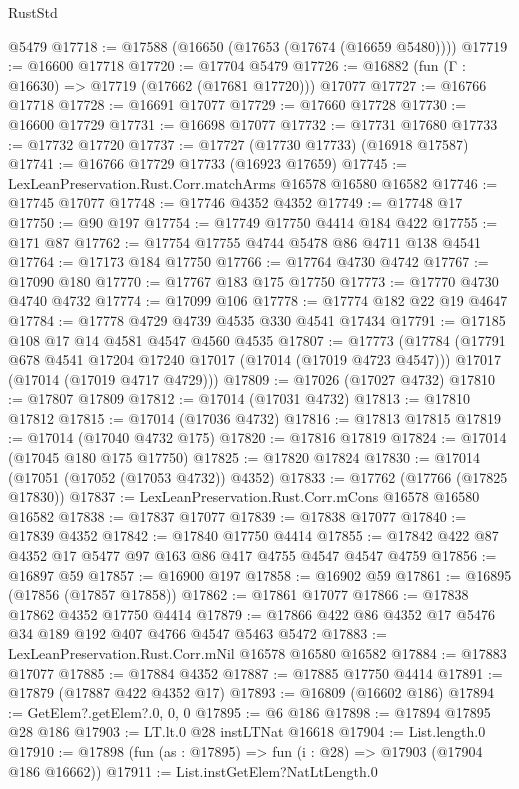 \begin{lexlean}{RustStd}
\begin{coremodule}
{\begin{coremodule}
{{{{{{{{{{{{{{{{{{{{{{{{{{{{{{{{{{{{{{{{{{{{{{{{{{{{{{{    @5479
@17718 := @17588 (@16650 (@17653 (@17674 (@16659 @5480))))
@17719 := @16600 @17718
@17720 := @17704 @5479
@17726 := @16882 (fun (Γ : @16630) => @17719 (@17662 (@17681 @17720))) @17077
@17727 := @16766 @17718
@17728 := @16691 @17077
@17729 := @17660 @17728
@17730 := @16600 @17729
@17731 := @16698 @17077
@17732 := @17731 @17680
@17733 := @17732 @17720
@17737 := @17727 (@17730 @17733) (@16918 @17587)
@17741 := @16766 @17729 @17733 (@16923 @17659)
@17745 := LexLeanPreservation.Rust.Corr.matchArms @16578 @16580 @16582
@17746 := @17745 @17077
@17748 := @17746 @4352 @4352
@17749 := @17748 @17
@17750 := @90 @197
@17754 := @17749 @17750 @4414 @184 @422
@17755 := @171 @87
@17762 := @17754 @17755 @4744 @5478 @86 @4711 @138 @4541
@17764 := @17173 @184 @17750
@17766 := @17764 @4730 @4742
@17767 := @17090 @180
@17770 := @17767 @183 @175 @17750
@17773 := @17770 @4730 @4740 @4732
@17774 := @17099 @106
@17778 := @17774 @182 @22 @19 @4647
@17784 := @17778 @4729 @4739 @4535 @330 @4541 @17434
@17791 := @17185 @108 @17 @14 @4581 @4547 @4560 @4535
@17807 := @17773
    (@17784
      (@17791 @678 @4541 @17204 @17240 @17017 (@17014 (@17019 @4723 @4547)))
      @17017
      (@17014 (@17019 @4717 @4729)))
@17809 := @17026 (@17027 @4732)
@17810 := @17807 @17809
@17812 := @17014 (@17031 @4732)
@17813 := @17810 @17812
@17815 := @17014 (@17036 @4732)
@17816 := @17813 @17815
@17819 := @17014 (@17040 @4732 @175)
@17820 := @17816 @17819
@17824 := @17014 (@17045 @180 @175 @17750)
@17825 := @17820 @17824
@17830 := @17014 (@17051 (@17052 (@17053 @4732)) @4352)
@17833 := @17762 (@17766 (@17825 @17830))
@17837 := LexLeanPreservation.Rust.Corr.mCons @16578 @16580 @16582
@17838 := @17837 @17077
@17839 := @17838 @17077
@17840 := @17839 @4352
@17842 := @17840 @17750 @4414
@17855 := @17842 @422 @87 @4352 @17 @5477 @97 @163 @86 @417 @4755 @4547 @4547 @4759
@17856 := @16897 @59
@17857 := @16900 @197
@17858 := @16902 @59
@17861 := @16895 (@17856 (@17857 @17858))
@17862 := @17861 @17077
@17866 := @17838 @17862 @4352 @17750 @4414
@17879 := @17866 @422 @86 @4352 @17 @5476 @34 @189 @192 @407 @4766 @4547 @5463 @5472
@17883 := LexLeanPreservation.Rust.Corr.mNil @16578 @16580 @16582
@17884 := @17883 @17077
@17885 := @17884 @4352
@17887 := @17885 @17750 @4414
@17891 := @17879 (@17887 @422 @4352 @17)
@17893 := @16809 (@16602 @186)
@17894 := GetElem?.getElem?.{0, 0, 0}
@17895 := @6 @186
@17898 := @17894 @17895 @28 @186
@17903 := LT.lt.{0} @28 instLTNat @16618
@17904 := List.length.{0}
@17910 := @17898 (fun (as : @17895) => fun (i : @28) => @17903 (@17904 @186 @16662))
@17911 := List.instGetElem?NatLtLength.{0}
}}}}}}}}}}}}}}}}}}}}}}}}}}}}}}}}}}}}}}}}}}}}}}}}}}}}}}}
\end{coremodule}}
\end{coremodule}
\end{lexlean}
